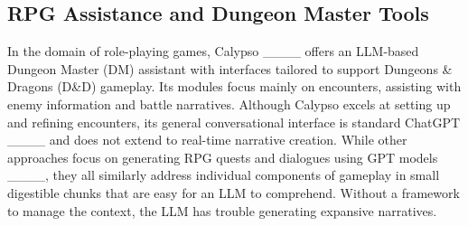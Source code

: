\subsection{RPG Assistance and Dungeon Master Tools}
In the domain of role-playing games, Calypso ____ offers an LLM-based Dungeon Master (DM) assistant with interfaces tailored to support Dungeons \& Dragons (D\&D) gameplay. Its modules focus mainly on encounters, assisting with enemy information and battle narratives. Although Calypso excels at setting up and refining encounters, its general conversational interface is standard ChatGPT ____ and does not extend to real-time narrative creation. While other approaches focus on generating RPG quests and dialogues using GPT models ____, they all similarly address individual components of gameplay in small digestible chunks that are easy for an LLM to comprehend. Without a framework to manage the context, the LLM has trouble generating expansive narratives.


